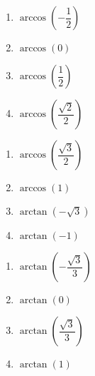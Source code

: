 \begin{multicols}{4}

\begin{enumerate}

\setcounter{enumi}{\value{HW}}

\item $\arccos \left( -\dfrac{1}{2} \right)$ 
\item $\arccos \left( 0 \right)$ 
\item $\arccos \left( \dfrac{1}{2} \right)$ 
\item $\arccos \left( \dfrac{\sqrt{2}}{2} \right)$

\setcounter{HW}{\value{enumi}}

\end{enumerate}

\end{multicols}

\begin{multicols}{4}

\begin{enumerate}

\setcounter{enumi}{\value{HW}}

\item $\arccos \left( \dfrac{\sqrt{3}}{2} \right)$
\item $\arccos \left( 1 \right)$ 
\item $\arctan \left( -\sqrt{3} \right)$ 
\item $\arctan \left( -1 \right)$ 

\setcounter{HW}{\value{enumi}}

\end{enumerate}

\end{multicols}

\begin{multicols}{4}

\begin{enumerate}

\setcounter{enumi}{\value{HW}}

\item $\arctan \left( -\dfrac{\sqrt{3}}{3} \right)$
\item $\arctan \left( 0 \right)$ 
\item $\arctan \left( \dfrac{\sqrt{3}}{3} \right)$
\item $\arctan \left( 1 \right)$ 

\setcounter{HW}{\value{enumi}}

\end{enumerate}

\end{multicols}

